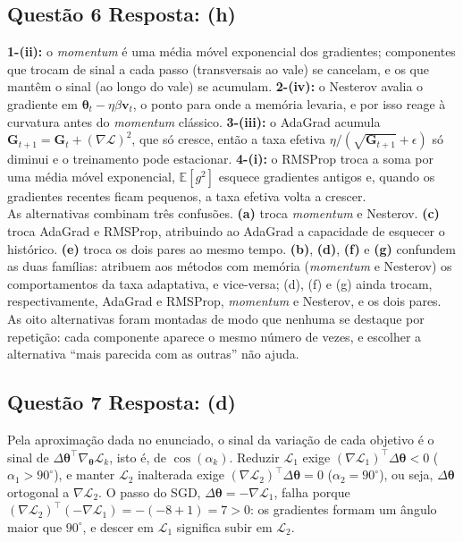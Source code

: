 \documentclass[11pt,a4paper]{article}
\begin{document}
\subsection*{Questão 6 \textemdash{} Resposta: (h)}
\textbf{1-(ii):} o \textit{momentum} é uma média móvel exponencial dos gradientes; componentes que trocam de sinal a cada passo (transversais ao vale) se cancelam, e os que mantêm o sinal (ao longo do vale) se acumulam.
\textbf{2-(iv):} o Nesterov avalia o gradiente em $\boldsymbol{\theta}_t - \eta\beta\mathbf{v}_t$, o ponto para onde a memória levaria, e por isso reage à curvatura antes do \textit{momentum} clássico.
\textbf{3-(iii):} o AdaGrad acumula $\mathbf{G}_{t+1} = \mathbf{G}_t + (\nabla\mathcal{L})^2$, que só cresce, então a taxa efetiva $\eta/(\sqrt{\mathbf{G}_{t+1}} + \epsilon)$ só diminui e o treinamento pode estacionar.
\textbf{4-(i):} o RMSProp troca a soma por uma média móvel exponencial, $\mathbb{E}[g^2]$ esquece gradientes antigos e, quando os gradientes recentes ficam pequenos, a taxa efetiva volta a crescer.\\
As alternativas combinam três confusões. \textbf{(a)} troca \textit{momentum} e Nesterov. \textbf{(c)} troca AdaGrad e RMSProp, atribuindo ao AdaGrad a capacidade de esquecer o histórico. \textbf{(e)} troca os dois pares ao mesmo tempo. \textbf{(b)}, \textbf{(d)}, \textbf{(f)} e \textbf{(g)} confundem as duas famílias: atribuem aos métodos com memória (\textit{momentum} e Nesterov) os comportamentos da taxa adaptativa, e vice-versa; (d), (f) e (g) ainda trocam, respectivamente, AdaGrad e RMSProp, \textit{momentum} e Nesterov, e os dois pares.
As oito alternativas foram montadas de modo que nenhuma se destaque por repetição: cada componente aparece o mesmo número de vezes, e escolher a alternativa ``mais parecida com as outras'' não ajuda.

\subsection*{Questão 7 \textemdash{} Resposta: (d)}
Pela aproximação dada no enunciado, o sinal da variação de cada objetivo é o sinal de $\Delta\boldsymbol{\theta}^{\top}\nabla_{\boldsymbol{\theta}}\mathcal{L}_k$, isto é, de $\cos(\alpha_k)$. Reduzir $\mathcal{L}_1$ exige $(\nabla\mathcal{L}_1)^{\top}\Delta\boldsymbol{\theta} < 0$ ($\alpha_1 > 90^{\circ}$), e manter $\mathcal{L}_2$ inalterada exige $(\nabla\mathcal{L}_2)^{\top}\Delta\boldsymbol{\theta} = 0$ ($\alpha_2 = 90^{\circ}$), ou seja, $\Delta\boldsymbol{\theta}$ ortogonal a $\nabla\mathcal{L}_2$. O passo do SGD, $\Delta\boldsymbol{\theta} = -\nabla\mathcal{L}_1$, falha porque $(\nabla\mathcal{L}_2)^{\top}(-\nabla\mathcal{L}_1) = -(-8 + 1) = 7 > 0$: os gradientes formam um ângulo maior que $90^{\circ}$, e descer em $\mathcal{L}_1$ significa subir em $\mathcal{L}_2$.
\end{document}
